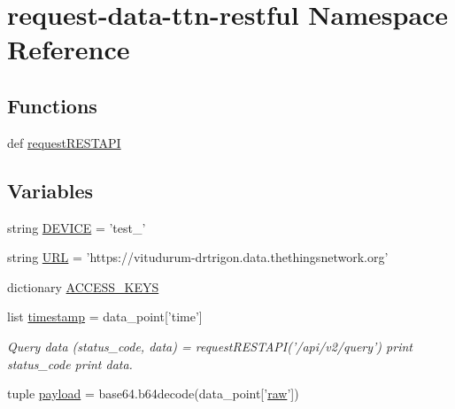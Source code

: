 \hypertarget{namespacerequest-data-ttn-restful}{\section{request-\/data-\/ttn-\/restful Namespace Reference}
\label{namespacerequest-data-ttn-restful}
}
\subsection*{Functions}
\begin{DoxyCompactItemize}
\item 
def \hyperlink{namespacerequest-data-ttn-restful_aaddceb415bfcc0aacaeb1b2233fc87ac}{request\-R\-E\-S\-T\-A\-P\-I}
\end{DoxyCompactItemize}
\subsection*{Variables}
\begin{DoxyCompactItemize}
\item 
string \hyperlink{namespacerequest-data-ttn-restful_ab52fb0a29d93ecf0ce90ac2a1ce186ca}{D\-E\-V\-I\-C\-E} = 'test\-\_'
\item 
string \hyperlink{namespacerequest-data-ttn-restful_ae8d40a33afa99acaa57ddcb9e61bcbbe}{U\-R\-L} = 'https\-://vitudurum-\/drtrigon.\-data.\-thethingsnetwork.\-org'
\item 
dictionary \hyperlink{namespacerequest-data-ttn-restful_a48d677de6ac441bcb5410b1ac8bde6bc}{A\-C\-C\-E\-S\-S\-\_\-\-K\-E\-Y\-S}
\item 
list \hyperlink{namespacerequest-data-ttn-restful_a10b3d06e39c1dd442f2f80a74fc635c1}{timestamp} = data\-\_\-point\mbox{[}'time'\mbox{]}
\begin{DoxyCompactList}\small\item\em Query data (status\-\_\-code, data) = request\-R\-E\-S\-T\-A\-P\-I('/api/v2/query') print status\-\_\-code print data. \end{DoxyCompactList}\item 
tuple \hyperlink{namespacerequest-data-ttn-restful_a2fb886d92f7defc758a7e48c36217f26}{payload} = base64.\-b64decode(data\-\_\-point\mbox{[}'\hyperlink{Uno__MultiWii__HardwarePlatform__Test_2Sensors_8cpp_a2ac761123eb9aa3dacd85dc88d857939}{raw}'\mbox{]})
\end{DoxyCompactItemize}


